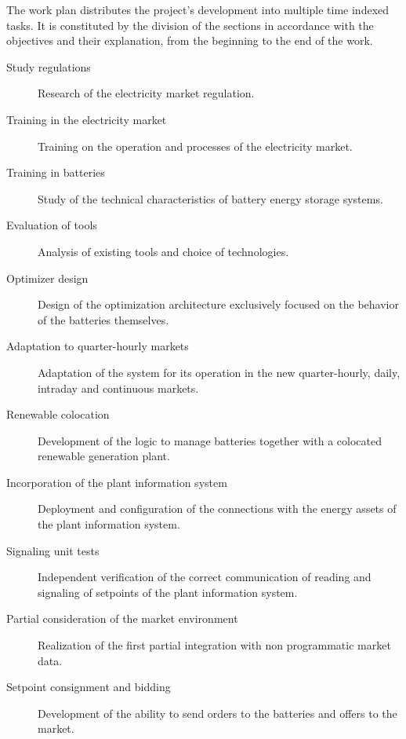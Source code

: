 The work plan distributes the project's development into multiple time indexed tasks. It is constituted by the division of the sections in accordance with the objectives and their explanation, from the beginning to the end of the work.

\begin{description}

  \item[Study regulations] Research of the electricity market regulation.

  \item[Training in the electricity market] Training on the operation and processes of the electricity market.

  \item[Training in batteries] Study of the technical characteristics of battery energy storage systems.

  \item[Evaluation of tools] Analysis of existing tools and choice of technologies.

  \item[Optimizer design] Design of the optimization architecture exclusively focused on the behavior of the batteries themselves.

  \item[Adaptation to quarter-hourly markets] Adaptation of the system for its operation in the new quarter-hourly, daily, intraday and continuous markets.

  \item[Renewable colocation] Development of the logic to manage batteries together with a colocated renewable generation plant.

  \item[Incorporation of the plant information system] Deployment and configuration of the connections with the energy assets of the plant information system.

  \item[Signaling unit tests] Independent verification of the correct communication of reading and signaling of setpoints of the plant information system.

  \item[Partial consideration of the market environment] Realization of the first partial integration with non programmatic market data.

  \item[Setpoint consignment and bidding] Development of the ability to send orders to the batteries and offers to the market.


\end{description}
